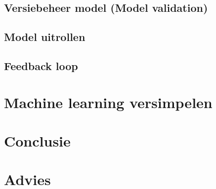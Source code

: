 \subsection{Versiebeheer model (Model validation)}\label{subsec:versiebeheer-model}


\subsection{Model uitrollen}\label{subsec:model-uitrollen}


\subsection{Feedback loop}\label{subsec:feebdack-loop}


\section{Machine learning versimpelen}\label{sec:machine-learning-versimpelen}


\section{Conclusie}\label{conclusie}


\section{Advies}\label{advies}